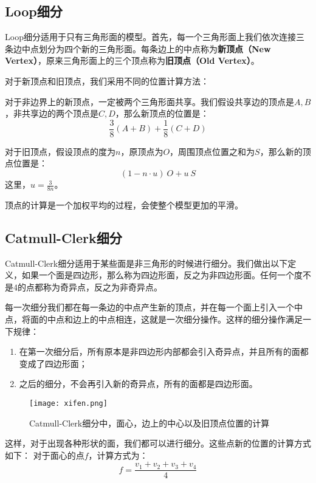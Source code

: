 \documentclass[openany]{progbookcn}
\begin{document}
\subsection{Loop细分}
Loop细分适用于只有三角形面的模型。首先，每一个三角形面上我们依次连接三条边中点划分为四个新的三角形面。每条边上的中点称为\textbf{新顶点（New Vertex）}，原来三角形面上的三个顶点称为\textbf{旧顶点（Old Vertex）}。

对于新顶点和旧顶点，我们采用不同的位置计算方法：

对于非边界上的新顶点，一定被两个三角形面共享。我们假设共享边的顶点是$A,B$，非共享边的两个顶点是$C,D$，那么新顶点的位置是：
\begin{equation}
	\frac{3}{8}(A+B)+\frac{1}{8}(C+D)
\end{equation}

对于旧顶点，假设顶点的度为$n$，原顶点为$O$，周围顶点位置之和为$S$，那么新的顶点位置是：
\begin{equation}
	(1-n\cdot u)\ O+u\ S
\end{equation}
这里，$u=\frac{3}{8n}$。

顶点的计算是一个加权平均的过程，会使整个模型更加的平滑。

\subsection{Catmull-Clerk细分}
Catmull-Clerk细分适用于某些面是非三角形的时候进行细分。我们做出以下定义，如果一个面是四边形，那么称为四边形面，反之为非四边形面。任何一个度不是$4$的点都称为奇异点，反之为非奇异点。

每一次细分我们都在每一条边的中点产生新的顶点，并在每一个面上引入一个中点，将面的中点和边上的中点相连，这就是一次细分操作。这样的细分操作满足一下规律：
\begin{enumerate}
	\item 在第一次细分后，所有原本是非四边形内部都会引入奇异点，并且所有的面都变成了四边形面；
	\item 之后的细分，不会再引入新的奇异点，所有的面都是四边形面。
\end{enumerate}

\begin{figure}[H]
	\centering
	\texttt{[image: xifen.png]}
	\caption{Catmull-Clerk细分中，面心，边上的中心以及旧顶点位置的计算}
	\label{fig:xifen}
\end{figure}
这样，对于出现各种形状的面，我们都可以进行细分。这些点新的位置的计算方式如下：
对于面心的点$f$，计算方式为：
\begin{equation}
	f=\frac{v_1+v_2+v_3+v_4}{4}
\end{equation}
\end{document}

